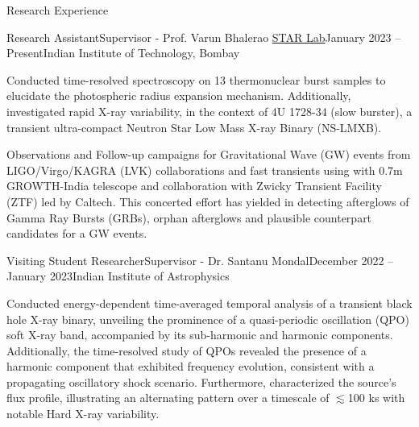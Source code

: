 \begin{section}{Research Experience}
    \begin{subsection}{Research Assistant}{Supervisor - Prof. Varun Bhalerao \href{https://www.star-iitb.in/home}{STAR Lab}}{January 2023 -- Present}{Indian Institute of Technology, Bombay}
            \item Conducted time-resolved spectroscopy on 13 thermonuclear burst samples to elucidate the photospheric 
            radius expansion mechanism. Additionally, investigated rapid X-ray variability, in the context of 4U 1728-34 (slow burster), a transient ultra-compact Neutron Star Low Mass X-ray Binary (NS-LMXB).

        \vspace{0.2em}
        
            \item Observations and Follow-up campaigns for Gravitational Wave (GW) events from LIGO/Virgo/KAGRA (LVK) collaborations and fast transients using with 0.7m GROWTH-India telescope and collaboration with Zwicky Transient Facility (ZTF) led by Caltech. This concerted effort has yielded in detecting afterglows of Gamma Ray Bursts (GRBs), orphan afterglows and plausible counterpart candidates for a GW events.
    \end{subsection}
\vspace{-0.1em}
    \begin{subsection}{Visiting Student Researcher}{Supervisor - Dr. Santanu Mondal}{December 2022 -- January 2023}{Indian Institute of Astrophysics}
        \item Conducted energy-dependent time-averaged temporal analysis of a transient black hole X-ray binary, unveiling the prominence of a quasi-periodic oscillation (QPO) soft X-ray band, accompanied by its sub-harmonic and harmonic components. Additionally, the time-resolved study of QPOs revealed the presence of a harmonic component that exhibited frequency evolution, consistent with a propagating oscillatory shock scenario. Furthermore, characterized the source's flux profile, illustrating an alternating pattern over a timescale of $\lesssim$100 ks with notable Hard X-ray variability.

    \end{subsection}

\end{section}

